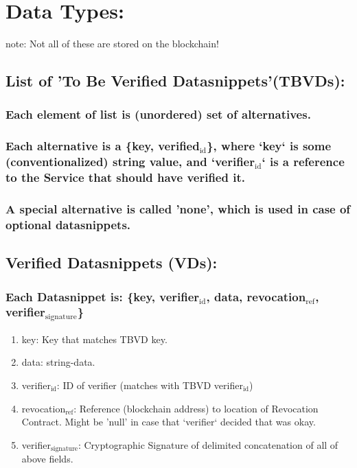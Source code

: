 \documentclass[11pt]{article}
\begin{document}
\section{Data Types:}
\label{sec:org138c4d5}
note: Not all of these are stored on the blockchain!
\subsection{List of 'To Be Verified Datasnippets'(TBVDs):}
\label{sec:org392820c}
\subsubsection{Each element of list is (unordered) set of alternatives.}
\label{sec:orgcada34c}
\subsubsection{Each alternative is a \{key, verified\(_{\text{id}}\)\}, where `key` is some (conventionalized) string value, and `verifier\(_{\text{id}}\)` is a reference to the Service that should have verified it.}
\label{sec:orga2ed2f8}
\subsubsection{A special alternative is called 'none', which is used in case of optional datasnippets.}
\label{sec:orgca0485f}
\subsection{Verified Datasnippets (VDs):}
\label{sec:org332eb13}
\subsubsection{Each Datasnippet is: \{key, verifier\(_{\text{id}}\), data, revocation\(_{\text{ref}}\), verifier\(_{\text{signature}}\)\}}
\label{sec:org0d49361}
\begin{enumerate}
\item key: Key that matches TBVD key.
\label{sec:org987a297}
\item data: string-data.
\label{sec:org7dfddd7}
\item verifier\(_{\text{id}}\): ID of verifier (matches with TBVD verifier\(_{\text{id}}\))
\label{sec:org9d5c2fb}
\item revocation\(_{\text{ref}}\): Reference (blockchain address) to location of Revocation Contract. Might be 'null' in case that `verifier` decided that was okay.
\label{sec:org4f95324}
\item verifier\(_{\text{signature}}\): Cryptographic Signature of delimited concatenation of all of above fields.
\label{sec:org7e216fb}
\end{enumerate}
\end{document}
